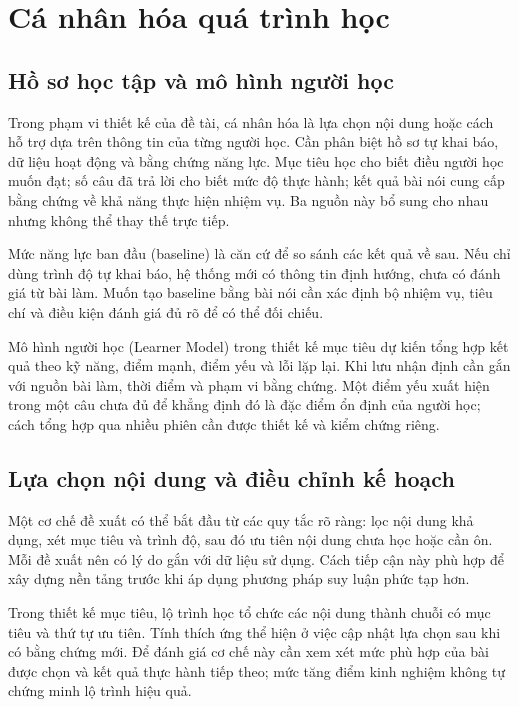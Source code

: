 \documentclass[12pt,a4paper,oneside]{report}
\begin{document}
\section{Cá nhân hóa quá trình học}

\subsection{Hồ sơ học tập và mô hình người học}

Trong phạm vi thiết kế của đề tài, cá nhân hóa là lựa chọn nội dung hoặc cách hỗ trợ dựa trên thông tin của từng người học. Cần phân biệt hồ sơ tự khai báo, dữ liệu hoạt động và bằng chứng năng lực. Mục tiêu học cho biết điều người học muốn đạt; số câu đã trả lời cho biết mức độ thực hành; kết quả bài nói cung cấp bằng chứng về khả năng thực hiện nhiệm vụ. Ba nguồn này bổ sung cho nhau nhưng không thể thay thế trực tiếp.

Mức năng lực ban đầu (baseline) là căn cứ để so sánh các kết quả về sau. Nếu chỉ dùng trình độ tự khai báo, hệ thống mới có thông tin định hướng, chưa có đánh giá từ bài làm. Muốn tạo baseline bằng bài nói cần xác định bộ nhiệm vụ, tiêu chí và điều kiện đánh giá đủ rõ để có thể đối chiếu.

Mô hình người học (Learner Model) trong thiết kế mục tiêu dự kiến tổng hợp kết quả theo kỹ năng, điểm mạnh, điểm yếu và lỗi lặp lại. Khi lưu nhận định cần gắn với nguồn bài làm, thời điểm và phạm vi bằng chứng. Một điểm yếu xuất hiện trong một câu chưa đủ để khẳng định đó là đặc điểm ổn định của người học; cách tổng hợp qua nhiều phiên cần được thiết kế và kiểm chứng riêng.

\subsection{Lựa chọn nội dung và điều chỉnh kế hoạch}

Một cơ chế đề xuất có thể bắt đầu từ các quy tắc rõ ràng: lọc nội dung khả dụng, xét mục tiêu và trình độ, sau đó ưu tiên nội dung chưa học hoặc cần ôn. Mỗi đề xuất nên có lý do gắn với dữ liệu sử dụng. Cách tiếp cận này phù hợp để xây dựng nền tảng trước khi áp dụng phương pháp suy luận phức tạp hơn.

Trong thiết kế mục tiêu, lộ trình học tổ chức các nội dung thành chuỗi có mục tiêu và thứ tự ưu tiên. Tính thích ứng thể hiện ở việc cập nhật lựa chọn sau khi có bằng chứng mới. Để đánh giá cơ chế này cần xem xét mức phù hợp của bài được chọn và kết quả thực hành tiếp theo; mức tăng điểm kinh nghiệm không tự chứng minh lộ trình hiệu quả.
\end{document}
